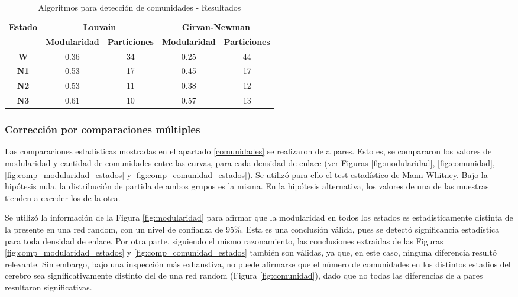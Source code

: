 \documentclass[a4paper,10pt,twocolumn,spanish]{article}
\begin{document}
\begin{table*}[ht]
\centering
\begin{tabular}{@{}ccccc@{}}
\toprule
\multirow{2}{*}{\textbf{Estado}} & \multicolumn{2}{c}{\textbf{Louvain}}        & \multicolumn{2}{c}{\textbf{Girvan-Newman}}  \\ \cmidrule(l){2-5} 
                                 & \textbf{Modularidad} & \textbf{Particiones} & \textbf{Modularidad} & \textbf{Particiones} \\ \midrule
\textbf{W}                       & 0.36                 & 34                   & 0.25                 & 44                   \\
\textbf{N1}                      & 0.53                 & 17                   & 0.45                 & 17                   \\
\textbf{N2}                      & 0.53                 & 11                   & 0.38                 & 12                   \\
\textbf{N3}                      & 0.61                 & 10                   & 0.57                 & 13                   \\ \bottomrule
\end{tabular}
\caption{Algoritmos para detección de comunidades - Resultados}
\label{tab:comunidades_resultados}
\end{table*}

\subsubsection{Corrección por comparaciones múltiples}

Las comparaciones estadísticas mostradas en el apartado \ref{comunidades} se realizaron de a pares. Esto es, se compararon los valores de modularidad y cantidad de comunidades entre las curvas, para cada densidad de enlace (ver Figuras \ref{fig:modularidad}, \ref{fig:comunidad}, \ref{fig:comp_modularidad_estados} y \ref{fig:comp_comunidad_estados}). Se utilizó para ello el test estadístico de Mann-Whitney. Bajo la hipótesis nula, la distribución de partida de ambos grupos es la misma. En la hipótesis alternativa, los valores de una de las muestras tienden a exceder los de la otra. 

Se utilizó la información de la Figura \ref{fig:modularidad} para afirmar que la modularidad en todos los estados es estadísticamente distinta de la presente en una red random, con un nivel de confianza de 95\%. Esta es una conclusión válida, pues se detectó significancia estadística para toda densidad de enlace. Por otra parte, siguiendo el mismo razonamiento, las conclusiones extraidas de las Figuras \ref{fig:comp_modularidad_estados} y \ref{fig:comp_comunidad_estados} también son válidas, ya que, en este caso, ninguna diferencia resultó relevante. Sin embargo, bajo una inspección más exhaustiva, no puede afirmarse que el número de comunidades en los distintos estadios del cerebro sea significativamente distinto del de una red random (Figura \ref{fig:comunidad}), dado que no todas las diferencias de a pares resultaron significativas.
\end{document}
